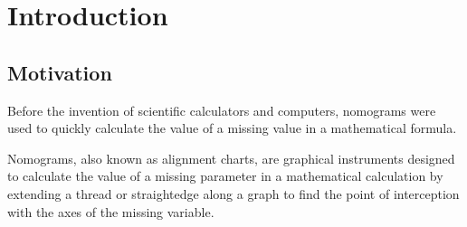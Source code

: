 \documentclass{l4proj}
\begin{document}
\tableofcontents

%
%
%
%
%
%
%
%
\chapter{Introduction}\label{introduction}

 \label{intro}

\section{Motivation}
Before the invention of scientific calculators and computers, nomograms were used to quickly calculate the value of a missing value in a mathematical formula. 

Nomograms, also known as alignment charts, are graphical instruments designed to calculate the value of a missing parameter in a mathematical calculation by extending a thread or straightedge along a graph to find the point of interception with the axes of the missing variable. 
\end{document}
